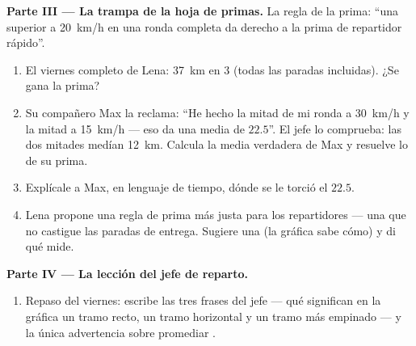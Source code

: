 \begin{problem}
\medskip\noindent\textbf{Parte III --- La trampa de la hoja de
primas.}
La regla de la prima: ``una  superior a
\qty{20}{km/h} en una ronda completa da derecho a la prima de
repartidor rápido''.
\begin{enumerate}[resume]
  \item El viernes completo de Lena: \qty{37}{km} en $3$
         (todas las paradas incluidas). ¿Se gana la prima?
  \item Su compañero Max la reclama: ``He hecho la mitad de mi ronda
        a \qty{30}{km/h} y la mitad a \qty{15}{km/h} --- eso da una
        media de $22.5$''. El jefe lo comprueba: las dos mitades
        medían \qty{12}{km}. Calcula la media verdadera de Max y
        resuelve lo de su prima.
  \item Explícale a Max, en lenguaje de tiempo, dónde se le torció el
        $22.5$.
  \item Lena propone una regla de prima más justa para los
        repartidores --- una que no castigue las paradas de entrega.
        Sugiere una (la gráfica sabe cómo) y di qué 
        mide.
\end{enumerate}

\medskip\noindent\textbf{Parte IV --- La lección del jefe de reparto.}
\begin{enumerate}[resume]
  \item Repaso del viernes: escribe las tres frases del jefe --- qué
        significan en la gráfica un tramo recto, un tramo horizontal
        y un tramo más empinado --- y la única advertencia sobre
        promediar .
\end{enumerate}
\end{problem}
